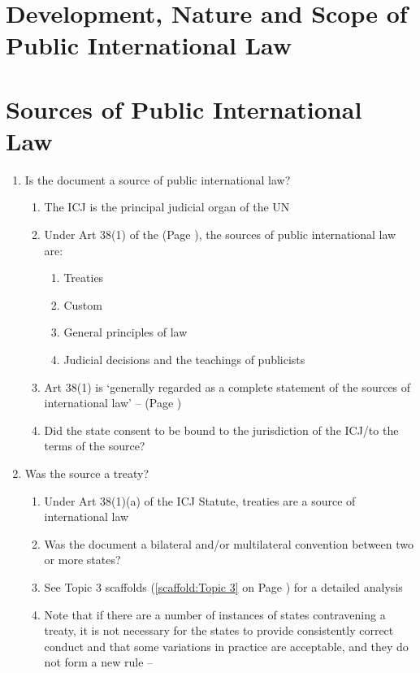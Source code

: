 \section{Development, Nature and Scope of Public International Law}

\section{Sources of Public International Law}
\begin{enumerate}
    \item Is the document a source of public international law?
    \begin{enumerate}
        \item The ICJ is the principal judicial organ of the UN
        \item Under Art 38(1) of the  (Page \pageref{ICJ Statute Art 38}), the sources of public international law are:
        \begin{enumerate}
            \item Treaties
            \item Custom
            \item General principles of law
            \item Judicial decisions and the teachings of publicists
        \end{enumerate}
        \item Art 38(1) is `generally regarded as a complete statement of the sources of international law' --  (Page \pageref{case:Ure v Commonwealth})
        \item Did the state consent to be bound to the jurisdiction of the ICJ/to the terms of the source?
    \end{enumerate}
    \item Was the source a treaty?
    \begin{enumerate}
        \item Under Art 38(1)(a) of the ICJ Statute, treaties are a source of international law
        \item Was the document a bilateral and/or multilateral convention between two or more states?
        \item See Topic 3 scaffolds (\ref{scaffold:Topic 3} on Page \pageref{scaffold:Topic 3}) for a detailed analysis
        \item Note that if there are a number of instances of states contravening a treaty, it is not necessary for the states to provide consistently correct conduct and that some variations in practice are acceptable, and they do not form a new rule -- 

\end{enumerate}
\end{enumerate}
